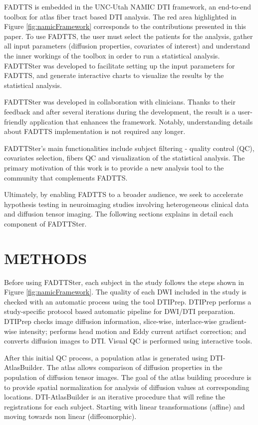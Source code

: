 \documentclass[]{spie}  %
\begin{document}
FADTTS is embedded in the UNC-Utah NAMIC DTI framework, an end-to-end toolbox for atlas fiber tract based DTI analysis. 
The red area highlighted in Figure \ref{fig:namicFramework} corresponds to the contributions
presented in this paper.
To use FADTTS, the user must select the patients for the analysis, gather all input parameters (diffusion properties, covariates of interest) and
understand the inner workings of the toolbox in order to run a statistical analysis. 
FADTTSter was developed to facilitate setting up the input parameters for FADTTS,
and generate interactive charts to visualize the results by the statistical analysis. 

FADTTSter was developed in collaboration with clinicians. Thanks to their feedback 
and after several iterations during the development, 
the result is a user-friendly application that enhances the 
framework. Notably, understanding
details about FADTTS implementation is not required any longer.  

FADTTSter's main functionalities include subject filtering - quality control (QC), covariates selection, 
fibers QC and visualization of the statistical analysis. The primary motivation 
of this work is to provide a new analysis tool to the community that complements FADTTS.

Ultimately, by enabling FADTTS to a broader audience, we seek to accelerate hypothesis testing in neuroimaging studies involving
heterogeneous clinical data and diffusion tensor imaging. 
The following sections explains in detail each component of FADTTSter.


\section{METHODS}
\label{sec:METHODS}

Before using FADTTSter, each subject in the study follows the steps shown in Figure \ref{fig:namicFramework}.
The quality of each DWI included in the study is checked with an automatic process using the tool DTIPrep. 
DTIPrep performs a study-specific protocol
based automatic pipeline for DWI/DTI preparation. DTIPrep checks image diffusion information, slice-wise, interlace-wise
gradient-wise intensity; performs head motion and Eddy current artifact correction; and converts diffusion images to 
DTI. Visual QC is performed using interactive tools. 

After this initial QC process, a population atlas is generated using DTI-AtlasBuilder\cite{unc-utah_namic_article,goodlett2009group}.  
The atlas allows comparison of diffusion properties in the population of diffusion tensor images.
The goal of the atlas building procedure is to provide spatial normalization for analysis of diffusion values at corresponding locations. 
DTI-AtlasBuilder is an iterative procedure that will refine the registrations for each subject. Starting with 
linear transformations (affine) and moving towards non linear (diffeomorphic).
\end{document}
